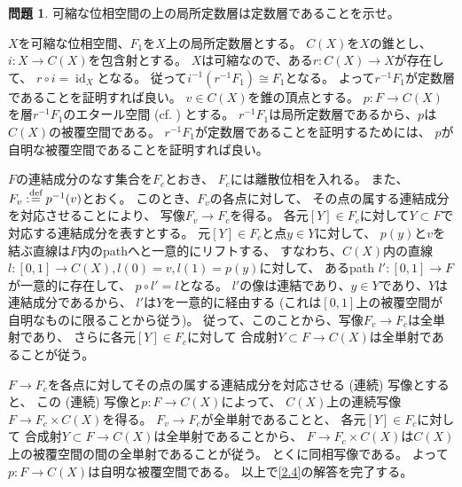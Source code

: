 \documentclass[uplatex,dvipdfmx]{jsarticle}
\makeatletter
\theoremstyle{definition}
\newtheorem{prob}[prob]{問題}
\renewenvironment{proof}[1][\proofname]{
  \pushQED{\qed}%
  \normalfont \topsep6\p@\@plus6\p@\relax
  \trivlist
  \item[\hskip\labelsep
    #1\@addpunct{\textbf{.}}]\ignorespaces
}{%
  \popQED\endtrivlist\@endpefalse
}
\providecommand{\proofname}{証明}
\DeclareMathOperator{\id}{\mathrm{id}}
\def\dfn{:\overset{\mbox{{\scriptsize def}}}{=}}
\makeatother
\begin{document}
\begin{prob}\label{2.4}
  可縮な位相空間の上の局所定数層は定数層であることを示せ。
\end{prob}

\begin{proof}
  \(X\)を可縮な位相空間、\(F_1\)を\(X\)上の局所定数層とする。
  \(C(X)\)を\(X\)の錐とし、
  \(i:X\to C(X)\)を包含射とする。
  \(X\)は可縮なので、ある\(r:C(X)\to X\)が存在して、
  \(r\circ i = \id_X\)となる。
  従って\(i^{-1}(r^{-1}F_1) \cong F_1\)となる。
  よって\(r^{-1}F_1\)が定数層であることを証明すれば良い。
  \(v\in C(X)\)を錐の頂点とする。
  \(p:F\to C(X)\)を層\(r^{-1}F_1\)のエタール空間
  (cf. \cite[Exercise 1.13]{Ha}) とする。
  \(r^{-1}F_1\)は局所定数層であるから、\(p\)は\(C(X)\)の被覆空間である。
  \(r^{-1}F_1\)が定数層であることを証明するためには、
  \(p\)が自明な被覆空間であることを証明すれば良い。

  \(F\)の連結成分のなす集合を\(F_c\)とおき、
  \(F_c\)には離散位相を入れる。
  また、\(F_v\dfn p^{-1}(v)\)とおく。
  このとき、\(F_v\)の各点に対して、
  その点の属する連結成分を対応させることにより、
  写像\(F_v\to F_c\)を得る。
  各元\([Y]\in F_c\)に対して\(Y\subset F\)で対応する連結成分を表すとする。
  元\([Y]\in F_c\)と点\(y\in Y\)に対して、
  \(p(y)\)と\(v\)を結ぶ直線は\(F\)内のpathへと一意的にリフトする、
  すなわち、\(C(X)\)内の直線
  \(l:[0,1]\to C(X), l(0)=v,l(1)=p(y)\)に対して、
  あるpath \(l':[0,1]\to F\)が一意的に存在して、
  \(p\circ l' = l\)となる。
  \(l'\)の像は連結であり、\(y\in Y\)であり、\(Y\)は連結成分であるから、
  \(l'\)は\(Y\)を一意的に経由する
  (これは\([0,1]\)上の被覆空間が自明なものに限ることから従う)。
  従って、このことから、写像\(F_v\to F_c\)は全単射であり、
  さらに各元\([Y]\in F_c\)に対して
  合成射\(Y\subset F\to C(X)\)は全単射であることが従う。

  \(F\to F_c\)を各点に対してその点の属する連結成分を対応させる (連続) 写像とすると、
  この (連続) 写像と\(p:F\to C(X)\)によって、
  \(C(X)\)上の連続写像\(F\to F_c\times C(X)\)を得る。
  \(F_v\to F_c\)が全単射であることと、
  各元\([Y]\in F_c\)に対して
  合成射\(Y\subset F\to C(X)\)は全単射であることから、
  \(F\to F_c\times C(X)\)は\(C(X)\)上の被覆空間の間の全単射であることが従う。
  とくに同相写像である。
  よって\(p:F\to C(X)\)は自明な被覆空間である。
  以上で\autoref{2.4}の解答を完了する。
\end{proof}
\end{document}

